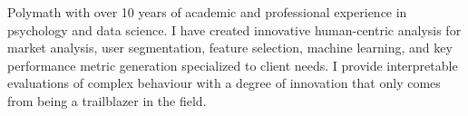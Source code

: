 \documentclass[letterpaper]{twentysecondcv} %
\begin{document}
\makeprofile
\vspace{-.2cm}
Polymath with over 10 years of academic and professional experience in psychology and data science. I have created innovative human-centric analysis for market analysis, user segmentation, feature selection, machine learning, and key performance metric generation specialized to client needs. I provide interpretable evaluations of complex behaviour with a degree of innovation that only comes from being a trailblazer in the field.




\end{document}
